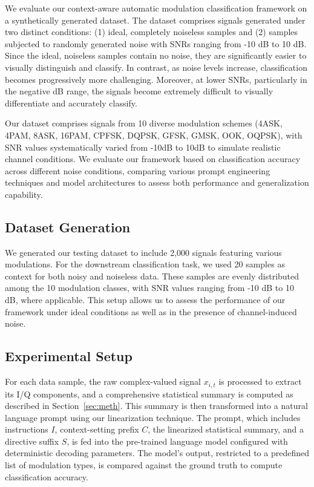 We evaluate our context-aware automatic modulation classification framework on a synthetically generated dataset. The dataset comprises signals generated under two distinct conditions: (1) ideal, completely noiseless samples and (2) samples subjected to randomly generated noise with SNRs ranging from -10 dB to 10 dB. Since the ideal, noiseless samples contain no noise, they are significantly easier to visually distinguish and classify. In contrast, as noise levels increase, classification becomes progressively more challenging. Moreover, at lower SNRs, particularly in the negative dB range, the signals become extremely difficult to visually differentiate and accurately classify. 

Our dataset comprises signals from 10 diverse modulation schemes (4ASK, 4PAM, 8ASK, 16PAM, CPFSK, DQPSK, GFSK, GMSK, OOK, OQPSK), with SNR values systematically varied from -10dB to 10dB to simulate realistic channel conditions. We evaluate our framework based on classification accuracy across different noise conditions, comparing various prompt engineering techniques and model architectures to assess both performance and generalization capability.

\subsection{Dataset Generation}
We generated our testing dataset to include 2,000 signals featuring various modulations. For the downstream classification task, we used 20 samples as context for both noisy and noiseless data. These samples are evenly distributed among the 10 modulation classes, with SNR values ranging from -10 dB to 10 dB, where applicable. This setup allows us to assess the performance of our framework under ideal conditions as well as in the presence of channel-induced noise.

\subsection{Experimental Setup}
For each data sample, the raw complex-valued signal $x_{i,t}$ is processed to extract its I/Q components, and a comprehensive statistical summary is computed as described in Section~\ref{sec:meth}. This summary is then transformed into a natural language prompt using our linearization technique. The prompt, which includes instructions $I$, context-setting prefix $C$, the linearized statistical summary, and a directive suffix $S$, is fed into the pre-trained language model configured with deterministic decoding parameters. The model's output, restricted to a predefined list of modulation types, is compared against the ground truth to compute classification accuracy.

